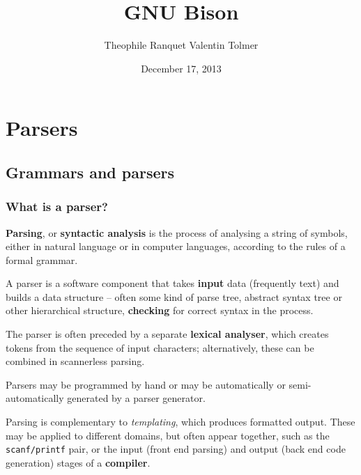 \documentclass{beamer}
\begin{document}
\title{GNU Bison}
\author{Theophile Ranquet
Valentin Tolmer}

\date{December 17, 2013}

\begin{frame}[plain]
  \titlepage
\end{frame}

\section{Parsers}

\subsection{Grammars and parsers}

\begin{frame}
  \frametitle{What is a parser?}
  \textbf{Parsing}, or \textbf{syntactic analysis} is the process of analysing
  a string of symbols, either in natural language or in computer languages,
  according to the rules of a formal grammar.

  \vfill

  A parser is a software component that takes \textbf{input} data (frequently
  text) and builds a data structure – often some kind of parse tree, abstract
  syntax tree or other hierarchical structure, \textbf{checking} for correct
  syntax in the process.

\end{frame}
\begin{frame}
  The parser is often preceded by a separate \textbf{lexical analyser}, which
  creates tokens from the sequence of input characters; alternatively, these
  can be combined in scannerless parsing.

  \vfill

  Parsers may be programmed by hand or may be automatically or
  semi-automatically generated by a parser generator.

  \vfill

  Parsing is complementary to \textit{templating}, which produces formatted output.
  These may be applied to different domains, but often appear together, such as
  the \texttt{scanf/printf} pair, or the input (front end parsing) and output
  (back end code generation) stages of a \textbf{compiler}.
\end{frame}
\end{document}
